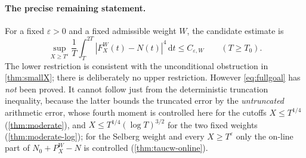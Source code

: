 \documentclass[11pt,a4paper]{article}
\numberwithin{equation}{section}
\theoremstyle{definition}
\theoremstyle{remark}
\newcommand{\dd}{\,\mathrm dt}
\begin{document}
\paragraph{The precise remaining statement.}
For a fixed $\varepsilon>0$ and a fixed admissible weight $W$, the candidate estimate is
\begin{equation}\label{eq:fullgoal}
\boxed{\displaystyle
\sup_{X\ge T^\varepsilon}
\frac1T\int_T^{2T}|F_X^W(t)-N(t)|^4\dd\le C_{\varepsilon,W}
\qquad(T\ge T_0).}
\end{equation}
The lower restriction is consistent with the unconditional obstruction in \cref{thm:smallX}; there is deliberately no upper restriction. However \eqref{eq:fullgoal} has \emph{not} been proved. It cannot follow just from the deterministic truncation inequality, because the latter bounds the truncated error by the \emph{untruncated} arithmetic error, whose fourth moment is controlled here for the cutoffs $X\le T^{1/4}$ (\cref{thm:moderate}), and $X\le T^{1/4}(\log T)^{3/2}$ for the two fixed weights (\cref{thm:moderate-log}); for the Selberg weight and every $X\ge T^\varepsilon$ only the on-line part of $N_0+P_X^W-N$ is controlled (\cref{thm:taucw-online}).
\end{document}

